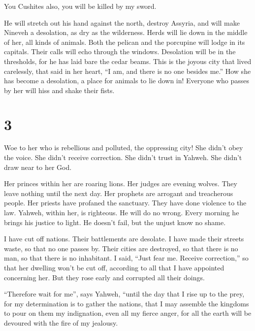  You Cushites also, you will be killed by my sword.

 He will stretch out his hand against the north, destroy
Assyria, and will make Nineveh a desolation, as dry as the wilderness.
 Herds will lie down in the middle of her, all kinds of
animals. Both the pelican and the porcupine will lodge in its capitals.
Their calls will echo through the windows. Desolation will be in the
thresholds, for he has laid bare the cedar beams.  This
is the joyous city that lived carelessly, that said in her heart, ``I
am, and there is no one besides me.'' How she has become a desolation, a
place for animals to lie down in! Everyone who passes by her will hiss
and shake their fists.

\hypertarget{section-2}{%
\section{3}\label{section-2}}

 Woe to her who is rebellious and polluted, the oppressing
city!  She didn't obey the voice. She didn't receive
correction. She didn't trust in Yahweh. She didn't draw near to her God.

 Her princes within her are roaring lions. Her judges are
evening wolves. They leave nothing until the next day. 
Her prophets are arrogant and treacherous people. Her priests have
profaned the sanctuary. They have done violence to the law.
 Yahweh, within her, is righteous. He will do no wrong.
Every morning he brings his justice to light. He doesn't fail, but the
unjust know no shame.

 I have cut off nations. Their battlements are desolate. I
have made their streets waste, so that no one passes by. Their cities
are destroyed, so that there is no man, so that there is no inhabitant.
 I said, ``Just fear me. Receive correction,'' so that her
dwelling won't be cut off, according to all that I have appointed
concerning her. But they rose early and corrupted all their doings.

 ``Therefore wait for me'', says Yahweh, ``until the day
that I rise up to the prey, for my determination is to gather the
nations, that I may assemble the kingdoms to pour on them my
indignation, even all my fierce anger, for all the earth will be
devoured with the fire of my jealousy.


